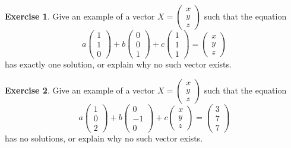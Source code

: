 \documentclass[11pt]{amsart}
\theoremstyle{definition}
\newtheorem{exercise}{Exercise}
\begin{document}
\begin{exercise}
Give an example of a vector $X = \begin{pmatrix} x \\ y \\ z\end{pmatrix}$ such that the equation
\[
a \begin{pmatrix} 1 \\ 1 \\ 0 \end{pmatrix} + b \begin{pmatrix} 0 \\ 0 \\ 1\end{pmatrix} + c \begin{pmatrix} 1 \\ 1 \\ 1\end{pmatrix} = \begin{pmatrix}x \\ y \\ z \end{pmatrix}
\]
has exactly one solution, or explain why no such vector exists.
\end{exercise}

\begin{exercise}
Give an example of a vector $X = \begin{pmatrix} x \\ y \\ z\end{pmatrix}$ such that the equation
\[
a \begin{pmatrix} 1 \\ 0 \\ 2 \end{pmatrix} + b \begin{pmatrix} 0 \\ -1 \\ 0\end{pmatrix} + c \begin{pmatrix} x \\ y \\ z\end{pmatrix} = \begin{pmatrix}3 \\ 7 \\ 7 \end{pmatrix}
\]
has no solutions, or explain why no such vector exists.
\end{exercise}
\end{document}
